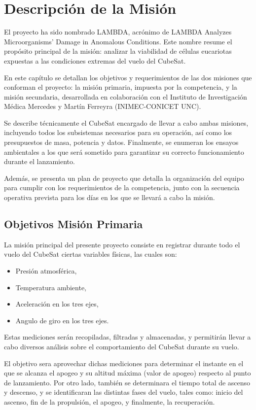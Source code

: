 \chapter{Descripción de la Misión}
El proyecto ha sido nombrado LAMBDA, acrónimo de LAMBDA Analyzes Microorganisms' Damage in
Anomalous Conditions. Este nombre resume el propósito principal de la misión: analizar la
viabilidad de células eucariotas expuestas a las condiciones extremas del vuelo del CubeSat.

En este capítulo se detallan los objetivos y requerimientos de las dos misiones que conforman el
proyecto:
la misión primaria, impuesta por la competencia, y la misión secundaria, desarrollada en
colaboración con el Instituto de Investigación Médica Mercedes y Martín Ferreyra (INIMEC-CONICET
UNC).

Se describe técnicamente el CubeSat encargado de llevar a cabo ambas misiones, incluyendo todos
los subsistemas necesarios para su operación, así como los presupuestos de masa, potencia y datos.
Finalmente, se enumeran los ensayos ambientales a los que será sometido para garantizar su
correcto funcionamiento durante el lanzamiento.

Además, se presenta un plan de proyecto que detalla la organización del equipo para cumplir con
los requerimientos de la competencia, junto con la secuencia operativa prevista para los días en
los que se llevará a cabo la misión.


\section{Objetivos Misión Primaria}
La misión principal del presente proyecto consiste en registrar durante todo el vuelo del
CubeSat ciertas variables físicas, las cuales son:

  \begin{itemize}
    \item Presión atmosférica,
    \item Temperatura ambiente,
    \item Aceleración en los tres ejes,
    \item Angulo de giro en los tres ejes.
  \end{itemize}

Estas mediciones serán recopiladas, filtradas y almacenadas, y permitirán llevar a cabo
diversos análisis sobre el comportamiento del CubeSat durante su vuelo.

El objetivo sera aprovechar dichas mediciones para determinar el instante en el que se
alcanza el apogeo y su altitud máxima (valor de apogeo) respecto al punto de lanzamiento.
Por otro lado, también se determinara el tiempo total de ascenso y descenso, y se identificaran
las distintas fases del vuelo, tales como: inicio del ascenso, fin de la propulsión, el apogeo,
y finalmente, la recuperación.

